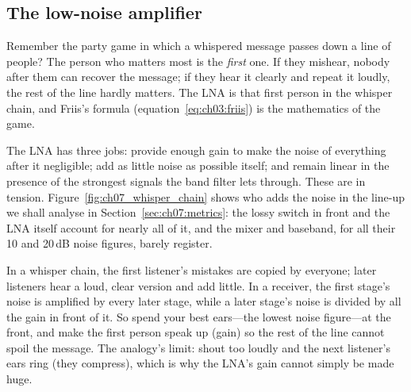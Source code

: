 \subsection{The low-noise amplifier}

Remember the party game in which a whispered message passes down a line of people? The person who
matters most is the \emph{first} one. If they mishear, nobody after them can recover the message; if
they hear it clearly and repeat it loudly, the rest of the line hardly matters. The LNA is that first
person in the whisper chain, and Friis's formula (equation~\eqref{eq:ch03:friis}) is the mathematics of
the game.

The LNA has three jobs: provide enough gain to make the noise of everything after it negligible; add
as little noise as possible itself; and remain linear in the presence of the strongest signals the band
filter lets through. These are in tension. Figure~\ref{fig:ch07_whisper_chain} shows who adds the
noise in the line-up we shall analyse in Section~\ref{sec:ch07:metrics}: the lossy switch in front and
the LNA itself account for nearly all of it, and the mixer and baseband, for all their 10 and 20\,dB
noise figures, barely register.


\begin{analogy}
In a whisper chain, the first listener's mistakes are copied by everyone; later listeners hear a loud,
clear version and add little. In a receiver, the first stage's noise is amplified by every later
stage, while a later stage's noise is divided by all the gain in front of it. So spend your best
ears---the lowest noise figure---at the front, and make the first person speak up (gain) so the rest of
the line cannot spoil the message. The analogy's limit: shout too loudly and the next listener's ears
ring (they compress), which is why the LNA's gain cannot simply be made huge.
\end{analogy}

